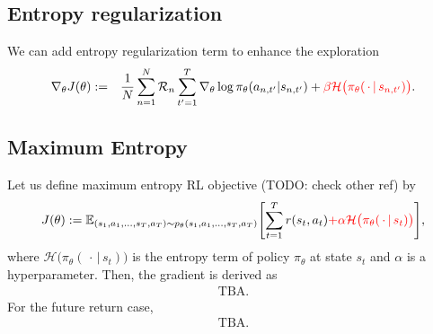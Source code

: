 \documentclass{article}
\begin{document}
\subsection{Entropy regularization}
We can add entropy regularization term to enhance the exploration~\citep{Mnih2016-eh}
\begin{eqnarray}
\nabla_\theta J(\theta)
&:=& \frac{1}{N} \sum_{n=1}^{N} \mathcal{R}_n \sum_{t^\prime=1}^{T} \nabla_\theta \log \pi_\theta (a_{n, t^\prime}|s_{n, t^\prime}) +
{\color{red}{\beta \mathcal{H} \bigl(\pi_\theta(\, \cdot \,|\, s_{n, t^\prime}) \bigr)}}.
\end{eqnarray}

\subsection{Maximum Entropy}
Let us define maximum entropy RL objective \citep{Haarnoja2017-xl} (TODO: check other ref) by
\begin{eqnarray}
J(\theta) := \mathbb{E}_{(s_1, a_1, \ldots, s_T, a_T) \sim p_\theta(s_1, a_1, \ldots, s_T, a_T)} \Biggl[ \sum_{t=1}^{T} r(s_t, a_t) {\color{red}{ + \alpha \mathcal{H} \bigl(\pi_\theta(\, \cdot \,|\, s_t) \bigr) }}\Biggr],
\end{eqnarray}
where $\mathcal{H} \bigl(\pi_\theta(\, \cdot \,|\, s_t) \bigr)$ is the entropy term of policy $\pi_\theta$ at state $s_t$ and $\alpha$ is a hyperparameter.
Then, the gradient is derived as
\begin{eqnarray}
\textrm{TBA.}
\end{eqnarray}
For the future return case,
\begin{eqnarray}
\textrm{TBA.}
\end{eqnarray}



\end{document}

